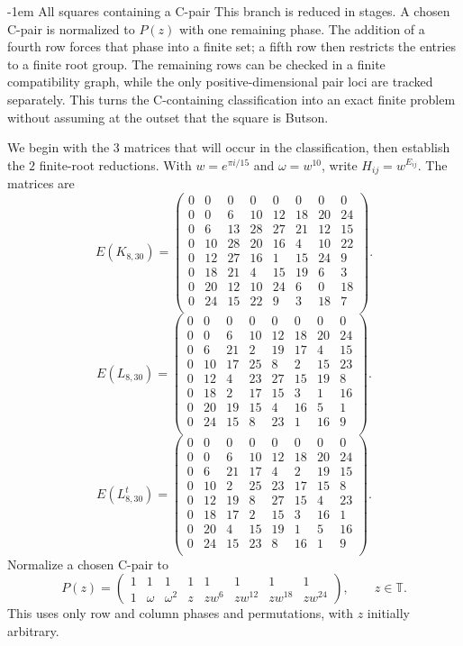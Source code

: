 \documentclass[11pt,a4paper]{article}
\makeatletter
\theoremstyle{plain}
\theoremstyle{definition}
\numberwithin{equation}{section}
\renewcommand\subsection{\@startsection{subsection}{2}{\z@}  {\medskipamount}  {-1em}  {\normalfont\normalsize\bfseries}}
\makeatother
\begin{document}
\subsection{All squares containing a C-pair}\label{sec:Ccomplete}
This branch is reduced in stages. A chosen C-pair is normalized to $P(z)$ with one remaining phase. The addition of a fourth row forces that phase into a finite set; a fifth row then restricts the entries to a finite root group. The remaining rows can be checked in a finite compatibility graph, while the only positive-dimensional pair loci are tracked separately. This turns the C-containing classification into an exact finite problem without assuming at the outset that the square is Butson.

We begin with the $3$ matrices that will occur in the classification, then establish the $2$ finite-root reductions. With $w=e^{\pi i/15}$ and $\omega=w^{10}$, write $H_{ij}=w^{E_{ij}}$. The matrices are
$$
E(K_{8,30})=\begin{pmatrix}
0&0&0&0&0&0&0&0\\
0&0&6&10&12&18&20&24\\
0&6&13&28&27&21&12&15\\
0&10&28&20&16&4&10&22\\
0&12&27&16&1&15&24&9\\
0&18&21&4&15&19&6&3\\
0&20&12&10&24&6&0&18\\
0&24&15&22&9&3&18&7\\
\end{pmatrix}.
$$
$$
E(L_{8,30})=\begin{pmatrix}
0&0&0&0&0&0&0&0\\
0&0&6&10&12&18&20&24\\
0&6&21&2&19&17&4&15\\
0&10&17&25&8&2&15&23\\
0&12&4&23&27&15&19&8\\
0&18&2&17&15&3&1&16\\
0&20&19&15&4&16&5&1\\
0&24&15&8&23&1&16&9\\
\end{pmatrix}.
$$
$$
E(L_{8,30}^{t})=\begin{pmatrix}
0&0&0&0&0&0&0&0\\
0&0&6&10&12&18&20&24\\
0&6&21&17&4&2&19&15\\
0&10&2&25&23&17&15&8\\
0&12&19&8&27&15&4&23\\
0&18&17&2&15&3&16&1\\
0&20&4&15&19&1&5&16\\
0&24&15&23&8&16&1&9\\
\end{pmatrix}.
$$
Normalize a chosen C-pair to
\begin{equation}\label{eq:Cpair}
P(z)=\begin{pmatrix}
1&1&1&1&1&1&1&1\\
1&\omega&\omega^2&z&zw^{6}&zw^{12}&zw^{18}&zw^{24}
\end{pmatrix},\qquad z\in\mathbb{T}.
\end{equation}
This uses only row and column phases and permutations, with $z$ initially arbitrary.
\end{document}
